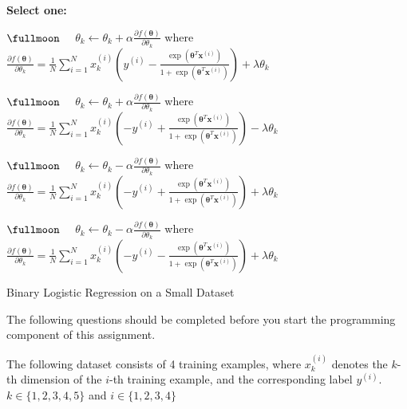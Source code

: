 \documentclass[11pt,addpoints,answers]{exam}
\newcommand{\emptycircle}{{\LARGE $\fullmoon$}\ \ }
\newcommand{\filledcircle}{{\LARGE $\newmoon$}\ \ }
\newcommand{\xv}{\mathbf{x}}
\newcommand{\thetav     }{\boldsymbol \theta     }
\begin{document}
\begin{questions}
\begin{parts}
    \textbf{Select one:}
    \begin{list}{}
        \item 
            \emptycircle 
            $\theta_k\leftarrow \theta_k + \alpha \frac{\partial f(\thetav)}{\partial \theta_k}$ where 
            $ \frac{\partial f(\thetav)}{\partial \theta_k}=\frac{1}{N}\sum_{i=1}^N x^{(i)}_k\left(y^{(i)} -\frac{\exp(\thetav^T \xv^{(i)})}{1+\exp(\thetav^T \xv^{(i)})} \right)+\lambda \theta_k$
        \item 
            \emptycircle 
            $\theta_k\leftarrow \theta_k + \alpha \frac{\partial f(\thetav)}{\partial \theta_k}$ where 
            $ \frac{\partial f(\thetav)}{\partial \theta_k}=\frac{1}{N}\sum_{i=1}^N x^{(i)}_k\left(-y^{(i)} +\frac{\exp(\thetav^T \xv^{(i)})}{1+\exp(\thetav^T \xv^{(i)})} \right)-\lambda \theta_k$
        \item 
            \emptycircle 
            $\theta_k\leftarrow \theta_k - \alpha \frac{\partial f(\thetav)}{\partial \theta_k}$ where 
            $ \frac{\partial f(\thetav)}{\partial \theta_k}=\frac{1}{N}\sum_{i=1}^N x^{(i)}_k\left(-y^{(i)} +\frac{\exp(\thetav^T \xv^{(i)})}{1+\exp(\thetav^T \xv^{(i)})} \right)+\lambda \theta_k$
        \item 
            \emptycircle 
            $\theta_k\leftarrow \theta_k - \alpha \frac{\partial f(\thetav)}{\partial \theta_k}$ where 
            $ \frac{\partial f(\thetav)}{\partial \theta_k}=\frac{1}{N}\sum_{i=1}^N x^{(i)}_k\left(-y^{(i)} -\frac{\exp(\thetav^T \xv^{(i)})}{1+\exp(\thetav^T \xv^{(i)})} \right)+\lambda \theta_k$
    \end{list}

    
\clearpage

\end{parts}

{\Large \question Binary Logistic Regression on a Small Dataset}
\label{sec:warm-up}

The following questions should be completed before you start the programming component of this assignment.

The following dataset consists of 4 training examples, where $x_k^{(i)}$ denotes the $k$-th dimension of the $i$-th training example, and the corresponding label $y^{(i)}$. $k \in \{1, 2, 3, 4, 5\}$ and $i \in \{1, 2, 3, 4\}$


\end{questions}
\end{document}
